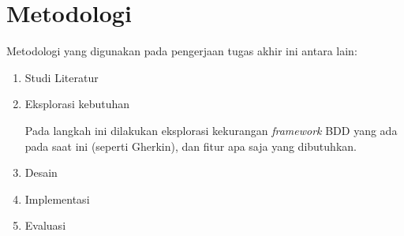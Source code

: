 \section{Metodologi}

Metodologi yang digunakan pada pengerjaan tugas akhir ini antara lain:

\begin{enumerate}
    \item Studi Literatur

    \item Eksplorasi kebutuhan

    Pada langkah ini dilakukan eksplorasi kekurangan \emph{framework} BDD yang ada pada saat ini
    (seperti Gherkin), dan fitur apa saja yang dibutuhkan.

    \item Desain 
    \item Implementasi 
    \item Evaluasi
\end{enumerate}
